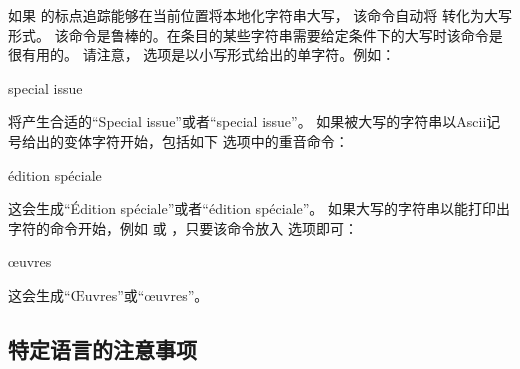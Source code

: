 \begin{ltxsyntax}


如果 \biblatex 的标点追踪能够在当前位置将本地化字符串大写，
该命令自动将  转化为大写形式。
该命令是鲁棒的。在条目的某些字符串需要给定条件下的大写时该命令是很有用的。
请注意， 选项是以小写形式给出的单字符。例如：

\begin{ltxexample}
\autocap{s}pecial issue
\end{ltxexample}
%
将产生合适的“Special issue”或者“special issue”。
如果被大写的字符串以Ascii记号给出的变体字符开始，包括如下  选项中的重音命令：

\begin{ltxexample}
\autocap{\'e}dition sp\'eciale
\end{ltxexample}
%
这会生成“Édition spéciale”或者“édition spéciale”。
如果大写的字符串以能打印出字符的命令开始，例如  或 ，只要该命令放入  选项即可：

\begin{ltxexample}
\autocap{\oe}uvres
\end{ltxexample}
%
这会生成“Œuvres”或“œuvres”。

\end{ltxsyntax}

\subsection[关于语言的注意事项]{特定语言的注意事项}%
\label{use:loc}

